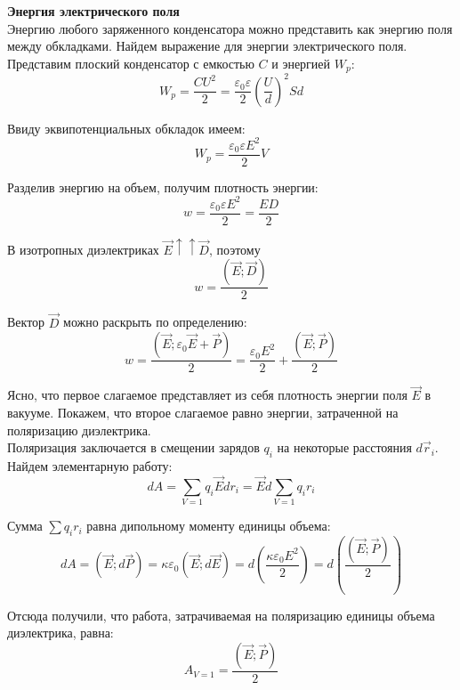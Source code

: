 \documentclass{article}
\begin{document}
	
	\textbf{Энергия электрического поля}\\

	Энергию любого заряженного конденсатора можно представить как энергию поля между обкладками. Найдем выражение для энергии электрического поля. Представим плоский конденсатор с емкостью $C$ и энергией $W_p$:
	\begin{equation}
		W_p = \frac{CU^2}{2} = \frac{\varepsilon_0\varepsilon}{2}(\frac{U}{d})^2 Sd
	\end{equation}

	Ввиду эквипотенциальных обкладок имеем:
	\begin{equation}
		W_p = \frac{\varepsilon_0\varepsilon E^2}{2}V
	\end{equation}

	Разделив энергию на объем, получим плотность энергии:
	\begin{equation}
		w = \frac{\varepsilon_0\varepsilon E^2}{2} = \frac{ED}{2}
	\end{equation}

	В изотропных диэлектриках $\vec E \uparrow\uparrow \vec D$, поэтому
	\begin{equation}
		w = \frac{(\vec E;\vec D)}{2}
	\end{equation}

	Вектор $\vec D$ можно раскрыть по определению:
	\begin{equation}
		w = \frac{(\vec E;\varepsilon_0\vec E + \vec P)}{2} = \frac{\varepsilon_0 E^2}{2} + \frac{(\vec E;\vec P)}{2}
	\end{equation}

	Ясно, что первое слагаемое представляет из себя плотность энергии поля $\vec E$ в вакууме. Покажем, что второе слагаемое равно энергии, затраченной на поляризацию диэлектрика. \\

	Поляризация заключается в смещении зарядов $q_i$ на некоторые расстояния $d\vec r_i$. Найдем элементарную работу:
	\begin{equation}
		dA = \sum_{V=1} q_i\vec E dr_i = \vec E d\sum_{V=1} q_i r_i 
	\end{equation}

	Сумма $\sum q_ir_i$ равна дипольному моменту единицы объема:
	\begin{equation}
		dA = (\vec E;d\vec P) = \kappa\varepsilon_0(\vec E;d\vec E) = d(\frac{\kappa\varepsilon_0E^2}{2}) = d(\frac{(\vec E;\vec P)}{2})
	\end{equation}

	Отсюда получили, что работа, затрачиваемая на поляризацию единицы объема диэлектрика, равна:
	\begin{equation}
		A_{V=1} = \frac{(\vec E;\vec P)}{2}
	\end{equation}
\end{document}
